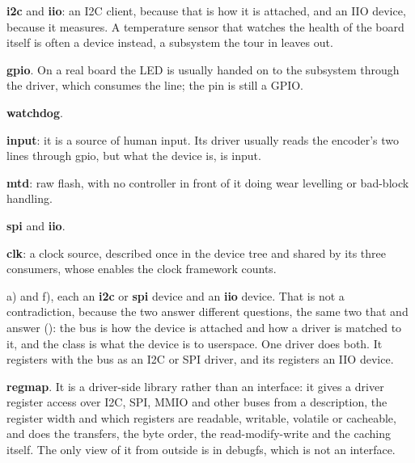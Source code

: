 
 \textbf{i2c} and \textbf{iio}: an I2C client, because that is how it is attached, and an
IIO device, because it measures. A temperature sensor that watches the health of the board itself
is often a  device instead, a subsystem the tour in  leaves out.

 \textbf{gpio}. On a real board the LED is usually handed on to the  subsystem
through the  driver, which consumes the line; the pin is still a GPIO.

 \textbf{watchdog}.

 \textbf{input}: it is a source of human input. Its driver usually reads the encoder's two
lines through gpio, but what the device is, is input.

 \textbf{mtd}: raw flash, with no controller in front of it doing wear levelling or
bad-block handling.

 \textbf{spi} and \textbf{iio}.

 \textbf{clk}: a clock source, described once in the device tree and shared by its three
consumers, whose enables the clock framework counts.

 a) and f), each an \textbf{i2c} or \textbf{spi} device and an \textbf{iio} device. That
is not a contradiction, because the two answer different questions, the same two that
 and  answer (): the bus is how the device is
attached and how a driver is matched to it, and the class is what the device is to userspace. One
driver does both. It registers with the bus as an I2C or SPI driver, and its  registers
an IIO device.

 \textbf{regmap}. It is a driver-side library rather than an interface: it gives a driver
register access over I2C, SPI, MMIO and other buses from a description, the register width and
which registers are readable, writable, volatile or cacheable, and does the transfers, the byte
order, the read-modify-write and the caching itself. The only view of it from outside is in
debugfs, which is not an interface.


